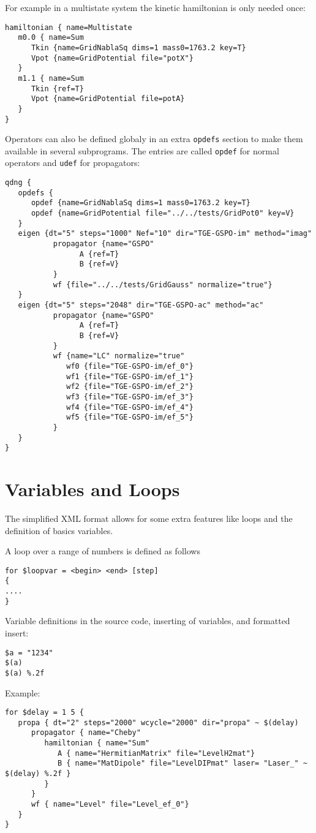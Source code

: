 \documentclass[a4paper,12pt]{scrbook}
\begin{document}
For example in a multistate system the kinetic hamiltonian
is only needed once:
\begin{verbatim}
hamiltonian { name=Multistate
   m0.0 { name=Sum
      Tkin {name=GridNablaSq dims=1 mass0=1763.2 key=T}
      Vpot {name=GridPotential file="potX"}
   }
   m1.1 { name=Sum
      Tkin {ref=T}
      Vpot {name=GridPotential file=potA}
   }
} 
\end{verbatim}

Operators can also be defined globaly in an extra \verb|opdefs| section to make them
available in several subprograms. The entries are called \verb|opdef| for normal operators
and \verb|udef| for propagators:
\begin{verbatim}
qdng {
   opdefs {
      opdef {name=GridNablaSq dims=1 mass0=1763.2 key=T}
      opdef {name=GridPotential file="../../tests/GridPot0" key=V}
   }
   eigen {dt="5" steps="1000" Nef="10" dir="TGE-GSPO-im" method="imag"
           propagator {name="GSPO"
                 A {ref=T}
                 B {ref=V}
           }
           wf {file="../../tests/GridGauss" normalize="true"}
   }
   eigen {dt="5" steps="2048" dir="TGE-GSPO-ac" method="ac"
           propagator {name="GSPO"
                 A {ref=T}
                 B {ref=V}
           }
           wf {name="LC" normalize="true"
              wf0 {file="TGE-GSPO-im/ef_0"}
              wf1 {file="TGE-GSPO-im/ef_1"}
              wf2 {file="TGE-GSPO-im/ef_2"}
              wf3 {file="TGE-GSPO-im/ef_3"}
              wf4 {file="TGE-GSPO-im/ef_4"}
              wf5 {file="TGE-GSPO-im/ef_5"}
           }
   }
}
\end{verbatim}

\section{Variables and Loops}
The simplified XML format allows for some extra
features like loops and the definition of basics
variables.

A loop over a range of numbers is defined as follows
\begin{verbatim}
for $loopvar = <begin> <end> [step]
{
....
}
\end{verbatim}

Variable definitions in the source code,
inserting of variables, and formatted insert:
\begin{verbatim}
$a = "1234"
$(a)
$(a) %.2f
\end{verbatim}

Example:
\begin{verbatim}
for $delay = 1 5 {
   propa { dt="2" steps="2000" wcycle="2000" dir="propa" ~ $(delay) 
      propagator { name="Cheby"
         hamiltonian { name="Sum"
            A { name="HermitianMatrix" file="LevelH2mat"}
            B { name="MatDipole" file="LevelDIPmat" laser= "Laser_" ~ $(delay) %.2f }
         }
      }
      wf { name="Level" file="Level_ef_0"}
   }
} 
\end{verbatim}
\end{document}
